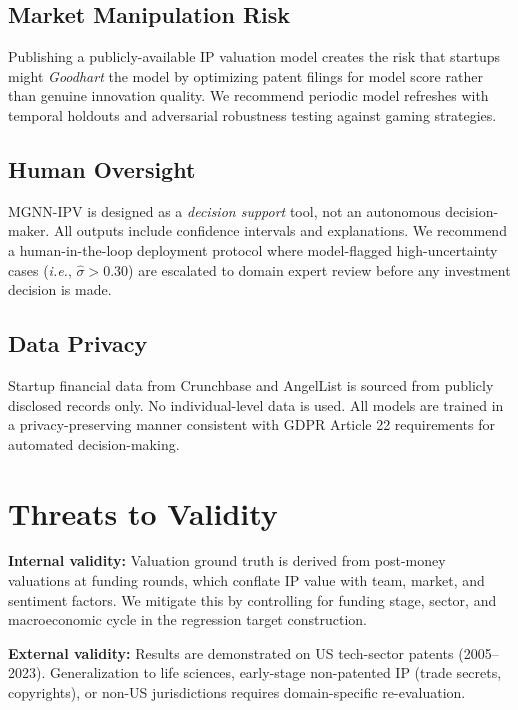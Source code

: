 \documentclass[journal]{IEEEtran}
\begin{document}
\subsection{Market Manipulation Risk}

Publishing a publicly-available IP valuation model creates the risk that startups might \textit{Goodhart} the model by optimizing patent filings for model score rather than genuine innovation quality. We recommend periodic model refreshes with temporal holdouts and adversarial robustness testing against gaming strategies.

\subsection{Human Oversight}

MGNN-IPV is designed as a \textit{decision support} tool, not an autonomous decision-maker. All outputs include confidence intervals and explanations. We recommend a human-in-the-loop deployment protocol where model-flagged high-uncertainty cases (\textit{i.e.}, $\hat{\sigma} > 0.30$) are escalated to domain expert review before any investment decision is made.

\subsection{Data Privacy}

Startup financial data from Crunchbase and AngelList is sourced from publicly disclosed records only. No individual-level data is used. All models are trained in a privacy-preserving manner consistent with GDPR Article 22 requirements for automated decision-making.

\section{Threats to Validity}

\textbf{Internal validity:} Valuation ground truth is derived from post-money valuations at funding rounds, which conflate IP value with team, market, and sentiment factors. We mitigate this by controlling for funding stage, sector, and macroeconomic cycle in the regression target construction.

\textbf{External validity:} Results are demonstrated on US tech-sector patents (2005--2023). Generalization to life sciences, early-stage non-patented IP (trade secrets, copyrights), or non-US jurisdictions requires domain-specific re-evaluation.
\end{document}
